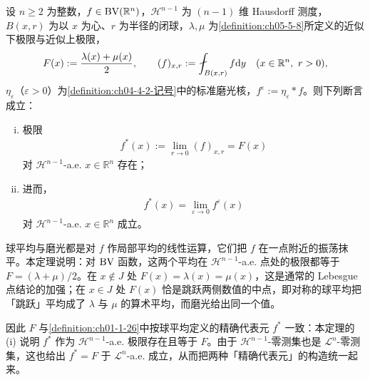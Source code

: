 \documentclass[../../main.tex]{subfiles}%
\begin{document}
\begin{theorem}[$\BV$ 函数与磨光核]\label{theorem:ch05-5-20}
设 $n\geqslant2$ 为整数，$f\in\mathrm{BV}(\mathbb{R}^n)$，$\mathcal{H}^{n-1}$ 为 $(n-1)$ 维 Hausdorff 测度，$B(x,r)$ 为以 $x$ 为心、$r$ 为半径的闭球，$\lambda,\mu$ 为\cref{definition:ch05-5-8}所定义的近似下极限与近似上极限， %
\begin{align*}
F(x):=\frac{\lambda(x)+\mu(x)}{2},\qquad (f)_{x,r}:=\fint_{B(x,r)}f\diff y\quad(x\in\mathbb{R}^n,\ r>0),
\end{align*}
$\eta_\varepsilon$（$\varepsilon>0$）为\cref{definition:ch04-4-2-记号}中的标准磨光核，$f^{\varepsilon}:=\eta_\varepsilon*f$。则下列断言成立：%
\begin{enumerate}[(i)]
\item 极限
\begin{align*}
f^{*}(x):=\lim_{r\to0}(f)_{x,r}=F(x)
\end{align*}
对 $\mathcal{H}^{n-1}$-a.e. $x\in\mathbb{R}^n$ 存在；
\item 进而，
\begin{align*}
f^{*}(x)=\lim_{\varepsilon\to0}f^{\varepsilon}(x)
\end{align*}
对 $\mathcal{H}^{n-1}$-a.e. $x\in\mathbb{R}^n$ 成立。
\end{enumerate}
\end{theorem}

\begin{remark}\label{remark:ch05-thm-5-20-动机}
球平均与磨光都是对 $f$ 作局部平均的线性运算，它们把 $f$ 在一点附近的振荡抹平。本定理说明：对 $\BV$ 函数，这两个平均在 $\mathcal{H}^{n-1}$-a.e. 点处的极限都等于 $F=(\lambda+\mu)/2$。在 $x\notin J$ 处 $F(x)=\lambda(x)=\mu(x)$，这是通常的 Lebesgue 点结论的加强；在 $x\in J$ 处 $F(x)$ 恰是跳跃两侧数值的中点，即对称的球平均把「跳跃」平均成了 $\lambda$ 与 $\mu$ 的算术平均，而磨光给出同一个值。

因此 $F$ 与\cref{definition:ch01-1-26}中按球平均定义的精确代表元 $f^{*}$ 一致：本定理的 (i) 说明 $f^{*}$ 作为 $\mathcal{H}^{n-1}$-a.e. 极限存在且等于 $F$。由于 $\mathcal{H}^{n-1}$-零测集也是 $\mathcal{L}^n$-零测集，这也给出 $f^{*}=F$ 于 $\mathcal{L}^n$-a.e. 成立，从而把两种「精确代表元」的构造统一起来。%
\end{remark}
\end{document}
